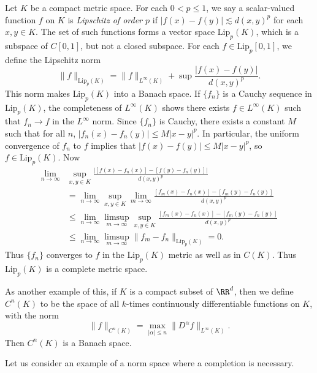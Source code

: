 \begin{example}
    Let $K$ be a compact metric space. For each $0 < p \leq 1$, we say a scalar-valued function $f$ on $K$ is {\it Lipschitz of order $p$} if $|f(x) - f(y)| \lesssim d(x,y)^p$ for each $x,y \in K$. The set of such functions forms a vector space $\text{Lip}_p(K)$, which is a subspace of $C[0,1]$, but not a closed subspace. For each $f \in \text{Lip}_p [0,1]$, we define the Lipschitz norm
    \[ \| f \|_{\text{Lip}_p(K)} = \| f \|_{L^\infty(K)} + \sup \frac{|f(x) - f(y)|}{d(x,y)^p}. \]
    This norm makes $\text{Lip}_p(K)$ into a Banach space. If $\{ f_n \}$ is a Cauchy sequence in $\text{Lip}_p(K)$, the completeness of $L^\infty(K)$ shows there exists $f \in L^\infty(K)$ such that $f_n \to f$ in the $L^\infty$ norm. Since $\{ f_n \}$ is Cauchy,  there exists a constant $M$ such that for all $n$, $|f_n(x) - f_n(y)| \leq M |x - y|^p$. In particular, the uniform convergence of $f_n$ to $f$ implies that $|f(x) - f(y)| \leq M |x - y|^p$, so $f \in \text{Lip}_p(K)$. Now
    \begin{align*}
        \lim_{n \to \infty} &\sup_{x,y \in K} \frac{|[f(x) - f_n(x)] - [f(y) - f_n(y)]|}{d(x,y)^p}\\
        &= \lim_{n \to \infty} \sup_{x,y \in K} \lim_{m \to \infty} \frac{[f_m(x) - f_n(x)] - [f_m(y) - f_n(y)]}{d(x,y)^p}\\
        &\leq \lim_{n \to \infty} \limsup_{m \to \infty} \sup_{x,y \in K} \frac{[f_m(x) - f_n(x)] - [f_m(y) - f_n(y)]}{d(x,y)^p}\\
        &\leq \lim_{n \to \infty} \limsup_{m \to \infty} \| f_m - f_n \|_{\text{Lip}_p(K)} = 0.
    \end{align*}
    Thus $\{ f_n \}$ converges to $f$ in the $\text{Lip}_p(K)$ metric as well as in $C(K)$. Thus $\text{Lip}_p(K)$ is a complete metric space.
\end{example}

\begin{example}
    As another example of this, if $K$ is a compact subset of $\RR^d$, then we define $C^n(K)$ to be the space of all $k$-times continuously differentiable functions on $K$, with the norm
    \[ \| f \|_{C^n(K)} = \max_{|\alpha| \leq n} \| D^\alpha f \|_{L^\infty(K)}. \]
    Then $C^n(K)$ is a Banach space.
\end{example}

Let us consider an example of a norm space where a completion is necessary.

